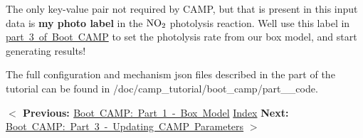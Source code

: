 The only key-\/value pair not required by CAMP, but that is present in this input data is {\bfseries{my photo label}} in the $\ce{NO2}$ photolysis reaction. We\textquotesingle{}ll use this label in \mbox{\hyperlink{camp_tutorial_part_3}{part 3 of Boot CAMP}} to set the photolysis rate from our box model, and start generating results!

The full configuration and mechanism {\ttfamily json} files described in the part of the tutorial can be found in {\ttfamily /doc/camp\+\_\+tutorial/boot\+\_\+camp/part\+\_\+\_\+code}.

 {\bfseries{ \texorpdfstring{$<$}{<} Previous\+: }} \mbox{\hyperlink{camp_tutorial_part_1}{Boot CAMP\+: Part 1 -\/ Box Model}}  \mbox{\hyperlink{camp_tutorial}{Index}}  {\bfseries{ Next\+: }} \mbox{\hyperlink{camp_tutorial_part_3}{Boot CAMP\+: Part 3 -\/ Updating CAMP Parameters}} {\bfseries{ \texorpdfstring{$>$}{>} }} 